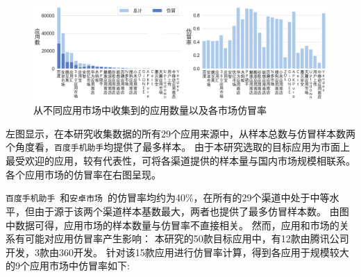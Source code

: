 \begin{figure}[htbp]
    \centering
    \setlength{\belowcaptionskip}{-10pt}
    \includegraphics[width=\textwidth]{./Figures/edwin-Number_of_samples_collected_markets_3.png}
    \caption{从不同应用市场中收集到的应用数量以及各市场仿冒率}
    \label{fig:Sample_source}
\end{figure}

左图显示，在本研究收集数据的所有29个应用来源中，从样本总数与仿冒样本数两个角度看，\texttt{百度手机助手}均提供了最多样本。
由于本研究选取的目标应用为市面上最受欢迎的应用，较有代表性，可将各渠道提供的样本量与国内市场规模相联系。
各个应用市场的仿冒率在右图呈现。


\texttt{百度手机助手}~\cite{Baiduappstore}和\texttt{安卓市场}~\cite{Hiapk}的仿冒率均约为40\%，在所有的29个渠道中处于中等水平，但由于源于该两个渠道样本基数最大，两者也提供了最多仿冒样本数。
由图中数据可得，应用市场的样本数量与仿冒率不直接相关。
然而，应用和市场的关系有可能对应用仿冒率产生影响：
本研究的50款目标应用中，有12款由腾讯公司开发，3款由360开发。
针对该15款应用进行仿冒率计算，得到各应用于规模较大的9个应用市场中仿冒率如下:

